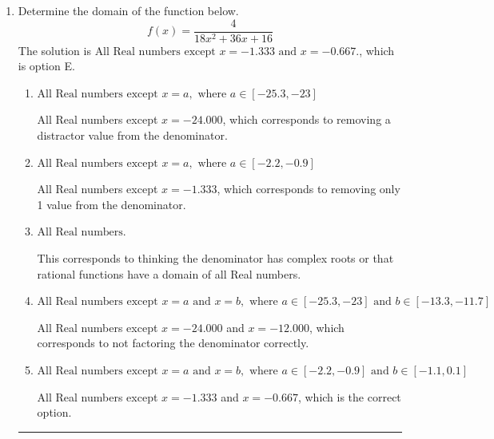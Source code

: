 \documentclass{extbook}[14pt]
\newcommand{\litem}[1]{\item #1

\rule{\textwidth}{0.4pt}}
\begin{document}
\begin{enumerate}\litem{
Determine the domain of the function below.
\[ f(x) = \frac{4}{18x^{2} +36 x + 16} \]The solution is \( \text{All Real numbers except } x = -1.333 \text{ and } x = -0.667. \), which is option E.\begin{enumerate}[label=\Alph*.]
\item \( \text{All Real numbers except } x = a, \text{ where } a \in [-25.3, -23] \)

All Real numbers except $x = -24.000$, which corresponds to removing a distractor value from the denominator.
\item \( \text{All Real numbers except } x = a, \text{ where } a \in [-2.2, -0.9] \)

All Real numbers except $x = -1.333$, which corresponds to removing only 1 value from the denominator.
\item \( \text{All Real numbers.} \)

This corresponds to thinking the denominator has complex roots or that rational functions have a domain of all Real numbers.
\item \( \text{All Real numbers except } x = a \text{ and } x = b, \text{ where } a \in [-25.3, -23] \text{ and } b \in [-13.3, -11.7] \)

All Real numbers except $x = -24.000$ and $x = -12.000$, which corresponds to not factoring the denominator correctly.
\item \( \text{All Real numbers except } x = a \text{ and } x = b, \text{ where } a \in [-2.2, -0.9] \text{ and } b \in [-1.1, 0.1] \)

All Real numbers except $x = -1.333$ and $x = -0.667$, which is the correct option.
\end{enumerate}

}
\end{enumerate}
\end{document}
